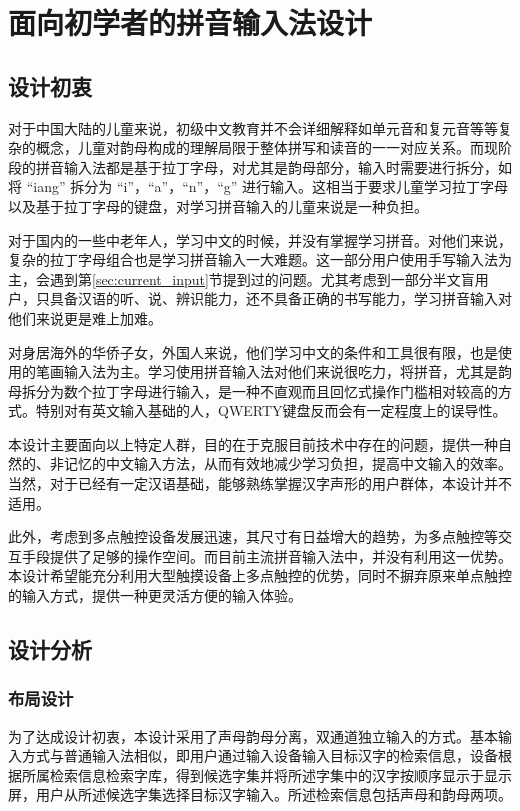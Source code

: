 \chapter{面向初学者的拼音输入法设计}
  \section{设计初衷}

  对于中国大陆的儿童来说，初级中文教育并不会详细解释如单元音和复元音等等复杂的概念，儿童对韵母构成的理解局限于整体拼写和读音的一一对应关系。而现阶段的拼音输入法都是基于拉丁字母，对尤其是韵母部分，输入时需要进行拆分，如将 “iang” 拆分为 “i”，“a”，“n”，“g” 进行输入。这相当于要求儿童学习拉丁字母以及基于拉丁字母的键盘，对学习拼音输入的儿童来说是一种负担。

  对于国内的一些中老年人，学习中文的时候，并没有掌握学习拼音。对他们来说，复杂的拉丁字母组合也是学习拼音输入一大难题。这一部分用户使用手写输入法为主，会遇到第\ref{sec:current_input}节提到过的问题。尤其考虑到一部分半文盲用户，只具备汉语的听、说、辨识能力，还不具备正确的书写能力，学习拼音输入对他们来说更是难上加难。

  对身居海外的华侨子女，外国人来说，他们学习中文的条件和工具很有限，也是使用的笔画输入法为主。学习使用拼音输入法对他们来说很吃力，将拼音，尤其是韵母拆分为数个拉丁字母进行输入，是一种不直观而且回忆式操作门槛相对较高的方式。特别对有英文输入基础的人，QWERTY键盘反而会有一定程度上的误导性。

  本设计主要面向以上特定人群，⽬的在于克服目前技术中存在的问题，提供⼀种自然的、⾮记忆的中⽂输⼊方法，从⽽有效地减少学习负担，提高中⽂输入的效率。当然，对于已经有一定汉语基础，能够熟练掌握汉字声形的用户群体，本设计并不适用。

  此外，考虑到多点触控设备发展迅速，其尺寸有日益增大的趋势，为多点触控等交互手段提供了足够的操作空间。而目前主流拼音输入法中，并没有利用这一优势。本设计希望能充分利用大型触摸设备上多点触控的优势，同时不摒弃原来单点触控的输入方式，提供一种更灵活方便的输入体验。

  \section{设计分析}
  \subsection{布局设计}

  为了达成设计初衷，本设计采用了声母韵母分离，双通道独立输入的方式。基本输入方式与普通输入法相似，即用户通过输入设备输入目标汉字的检索信息，设备根据所属检索信息检索字库，得到候选字集并将所述字集中的汉字按顺序显示于显示屏，用户从所述候选字集选择目标汉字输入。所述检索信息包括声母和韵母两项。

